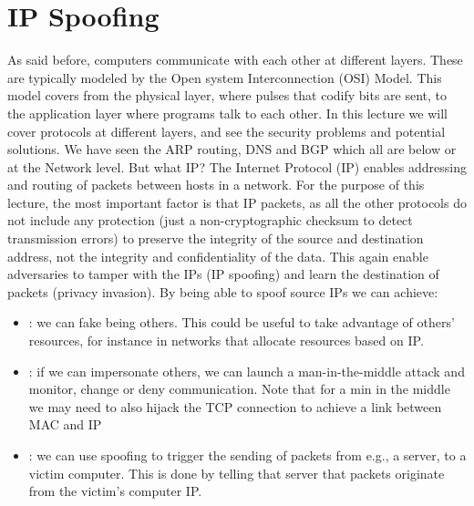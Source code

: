 \section{IP Spoofing}
As said before, computers communicate with each other at different layers. These are typically modeled by the Open system Interconnection (OSI) Model. This model covers from the physical layer, where pulses that codify bits are sent, to the application layer where programs talk to each other. In this lecture we will cover protocols at different layers, and see the security problems and potential solutions.  We have seen the ARP routing, DNS and BGP which all are below or at the Network level. But what IP? The Internet Protocol (IP) enables addressing and routing of packets between hosts in a network. For the purpose of this lecture, the most important factor is that IP packets, as all the other protocols do not include any protection (just a non-cryptographic checksum to detect transmission errors) to preserve the integrity of the source and destination address, not the integrity and confidentiality of the data. This again enable adversaries to tamper with the IPs (IP spoofing) and learn the destination of packets (privacy invasion). By being able to spoof source IPs we can achieve: 
\begin{itemize}
    \item {}: we can fake being others. This could be useful to take advantage of others' resources, for instance in networks that allocate resources based on IP.
    \item {}: if we can impersonate others, we can launch a man-in-the-middle attack and monitor, change or deny communication. Note that for a min in the middle we may need to also hijack the TCP connection to achieve a link between MAC and IP
    \item {}: we can use spoofing to trigger the sending of packets from e.g., a server, to a victim computer. This is done by telling that server that packets originate from the victim's computer IP.
\end{itemize}

